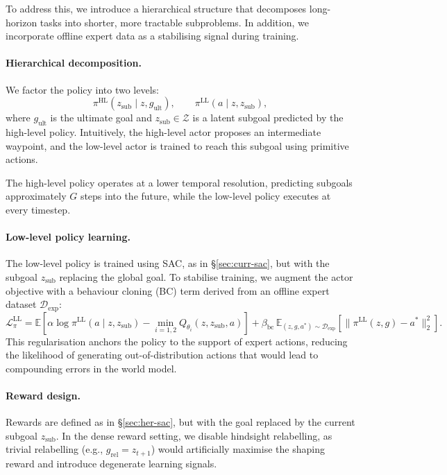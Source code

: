 To address this, we introduce a hierarchical structure that decomposes
long-horizon tasks into shorter, more tractable subproblems. In addition,
we incorporate offline expert data as a stabilising signal during
training.

\paragraph{Hierarchical decomposition.}
We factor the policy into two levels:
\begin{equation}
\pi^{\mathrm{HL}}(z_{\mathrm{sub}} \mid z, g_{\mathrm{ult}}),
\qquad
\pi^{\mathrm{LL}}(a \mid z, z_{\mathrm{sub}}),
\end{equation}
where $g_{\mathrm{ult}}$ is the ultimate goal and
$z_{\mathrm{sub}} \in \mathcal{Z}$ is a latent subgoal predicted by the
high-level policy. Intuitively, the high-level actor proposes an
intermediate waypoint, and the low-level actor is trained to reach this
subgoal using primitive actions.

The high-level policy operates at a lower temporal resolution, predicting
subgoals approximately $G$ steps into the future, while the low-level
policy executes at every timestep.

\paragraph{Low-level policy learning.}
The low-level policy is trained using SAC, as in
\S\ref{sec:curr-sac}, but with the subgoal $z_{\mathrm{sub}}$ replacing
the global goal. To stabilise training, we augment the actor objective
with a behaviour cloning (BC) term derived from an offline expert
dataset $\mathcal{D}_{\mathrm{exp}}$:
\begin{equation}
\mathcal{L}_\pi^{\mathrm{LL}} =
\mathbb{E}\!\left[\alpha \log \pi^{\mathrm{LL}}(a \mid z, z_{\mathrm{sub}})
- \min_{i=1,2} Q_{\theta_i}(z, z_{\mathrm{sub}}, a)\right]
+ \beta_{\mathrm{bc}}\,
\mathbb{E}_{(z,g,a^*) \sim \mathcal{D}_{\mathrm{exp}}}
\!\left[\|\pi^{\mathrm{LL}}(z,g) - a^*\|_2^2\right].
\end{equation}
This regularisation anchors the policy to the support of expert actions,
reducing the likelihood of generating out-of-distribution actions that
would lead to compounding errors in the world model.

\paragraph{Reward design.}
Rewards are defined as in \S\ref{sec:her-sac}, but with the goal replaced
by the current subgoal $z_{\mathrm{sub}}$. In the dense reward setting,
we disable hindsight relabelling, as trivial relabelling (e.g.,
$g_{\mathrm{rel}} = z_{t+1}$) would artificially maximise the shaping
reward and introduce degenerate learning signals.

